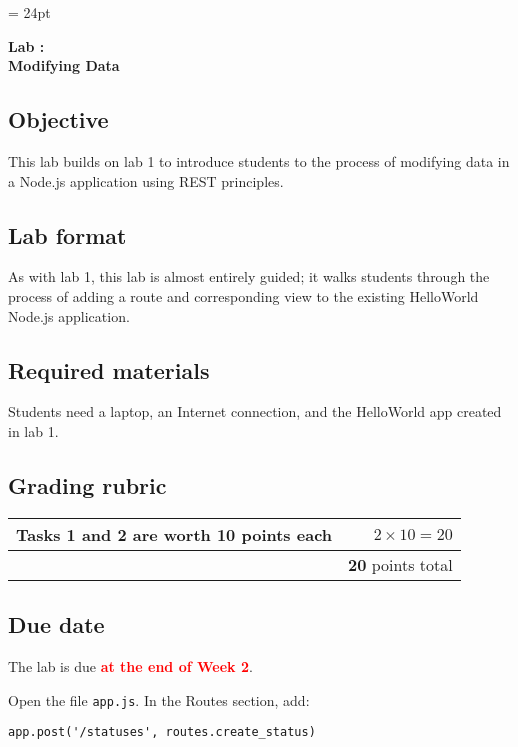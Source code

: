 \documentclass{article}
\newcommand{\labduedate}{at the end of Week 2}
\begin{document}
\chead{\textcolor{Gray}{CSSE491 -- Scalable Computing Lab Assignment}}
\headsep = 24pt

\begin{center}
{ \large
\textbf{Lab \labnumber: \longproductname} \\
\textbf{Modifying Data}
}
\end{center}

\subsection*{Objective}
This lab builds on lab 1 to introduce students to the process of modifying data in a Node.js application using REST principles.

\subsection*{Lab format}
As with lab 1, this lab is almost entirely guided; it walks students through the process of adding a route and corresponding view to the existing HelloWorld Node.js application.

\subsection*{Required materials}
Students need a laptop, an Internet connection, and the HelloWorld app created in lab 1.

\subsection*{Grading rubric}
\begin{tabular}{p{5.5in} r}
Tasks 1 and 2 are worth \textbf{10} points each & $2 \times 10 = 20$ \\ \hline
& \textbf{20} points total
\end{tabular}

\subsection*{Due date}
The lab is due \textcolor{red}{\textbf{\labduedate}}.




Open the file \verb!app.js!. In the Routes section, add:

\begin{verbatim}
app.post('/statuses', routes.create_status)
\end{verbatim}
\end{document}
